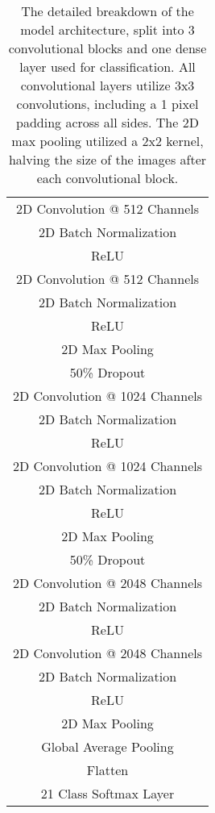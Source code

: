 \begin{table}[ht]
	\centering
	\begin{tabular}{||c||}
		\hline
		2D Convolution @ 512 Channels \\
		2D Batch Normalization \\
		ReLU \\
		2D Convolution @ 512 Channels \\
		2D Batch Normalization \\
		ReLU \\
		2D Max Pooling\\
		\hline\hline
		50\% Dropout \\
		2D Convolution @ 1024 Channels \\
		2D Batch Normalization \\
		ReLU \\
		2D Convolution @ 1024 Channels \\
		2D Batch Normalization \\
		ReLU \\
		2D Max Pooling\\
		\hline\hline
		50\% Dropout \\
		2D Convolution @ 2048 Channels \\
		2D Batch Normalization \\
		ReLU \\
		2D Convolution @ 2048 Channels \\
		2D Batch Normalization \\
		ReLU \\
		2D Max Pooling\\
		\hline\hline
		Global Average Pooling \\
		Flatten \\
		21 Class Softmax Layer \\
		\hline
	\end{tabular}
	\caption{The detailed breakdown of the model architecture, split into 3 convolutional blocks and one dense layer used for classification. All convolutional layers utilize 3x3 convolutions, including a 1 pixel padding across all sides. The 2D max pooling utilized a 2x2 kernel, halving the size of the images after each convolutional block.}
	\label{tab:detailed-model}
\end{table}